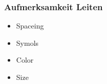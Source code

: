 \subsubsection{Aufmerksamkeit Leiten}

\begin{itemize}
	\item Spaceing
	\item Symols
	\item Color
	\item Size
\end{itemize}

